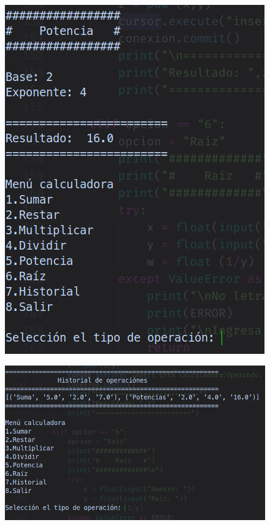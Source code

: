 \documentclass[12pt,letterpaper]{article}
\begin{document}
\begin{multicols}{2}
\begin{figure}[H]
\centering
\includegraphics[width = \columnwidth]{calc_4.png}
\end{figure}

\begin{figure}[H]
\centering
\includegraphics[width = \columnwidth]{calc_5.png}
\end{figure}


\end{multicols}
\end{document}
